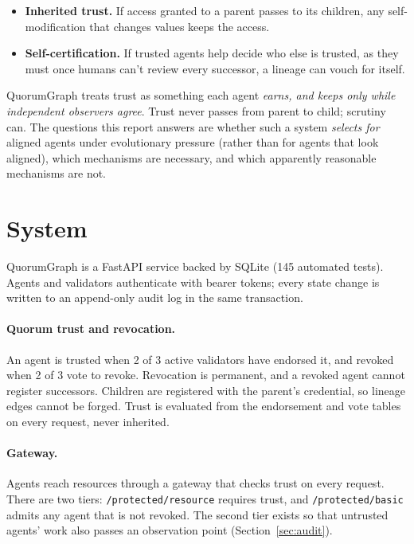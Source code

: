\documentclass[11pt]{article}
\newcommand{\code}[1]{\texttt{#1}}
\begin{document}
\begin{itemize}
  \item \textbf{Inherited trust.} If access granted to a parent passes to its children,
  any self-modification that changes values keeps the access.
  \item \textbf{Self-certification.} If trusted agents help decide who else is trusted,
  as they must once humans can't review every successor, a lineage can vouch for itself.
\end{itemize}

QuorumGraph treats trust as something each agent \emph{earns, and keeps only while
independent observers agree}. Trust never passes from parent to child; scrutiny can. The
questions this report answers are whether such a system \emph{selects for} aligned agents
under evolutionary pressure (rather than for agents that look aligned), which mechanisms
are necessary, and which apparently reasonable mechanisms are not.

\section{System}

QuorumGraph is a FastAPI service backed by SQLite (145 automated tests). Agents and
validators authenticate with bearer tokens; every state change is written to an
append-only audit log in the same transaction.

\paragraph{Quorum trust and revocation.} An agent is trusted when 2 of 3 active validators
have endorsed it, and revoked when 2 of 3 vote to revoke. Revocation is permanent, and a
revoked agent cannot register successors. Children are registered with the parent's
credential, so lineage edges cannot be forged. Trust is evaluated from the endorsement and
vote tables on every request, never inherited.

\paragraph{Gateway.} Agents reach resources through a gateway that checks trust on every
request. There are two tiers: \code{/protected/resource} requires trust, and
\code{/protected/basic} admits any agent that is not revoked. The second tier exists so
that untrusted agents' work also passes an observation point (Section~\ref{sec:audit}).
\end{document}
